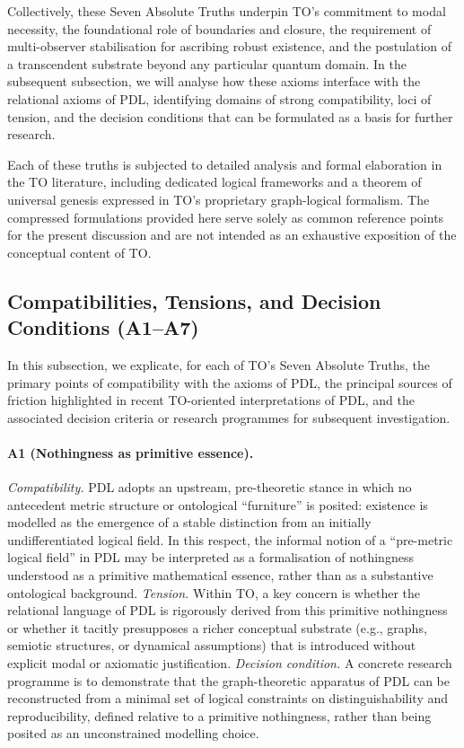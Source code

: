 \documentclass[11pt,a4paper]{article}
\begin{document}
Collectively, these Seven Absolute Truths underpin TO’s commitment to modal necessity, the foundational role of boundaries and closure, the requirement of multi-observer stabilisation for ascribing robust existence, and the postulation of a transcendent substrate beyond any particular quantum domain. In the subsequent subsection, we will analyse how these axioms interface with the relational axioms of PDL, identifying domains of strong compatibility, loci of tension, and the decision conditions that can be formulated as a basis for further research.

Each of these truths is subjected to detailed analysis and formal elaboration in the TO literature, including dedicated logical frameworks and a theorem of universal genesis expressed in TO’s proprietary graph-logical formalism. The compressed formulations provided here serve solely as common reference points for the present discussion and are not intended as an exhaustive exposition of the conceptual content of TO.

\subsection{Compatibilities, Tensions, and Decision Conditions (A1--A7)}

In this subsection, we explicate, for each of TO’s Seven Absolute Truths, the primary points of compatibility with the axioms of PDL, the principal sources of friction highlighted in recent TO-oriented interpretations of PDL, and the associated decision criteria or research programmes for subsequent investigation.

\paragraph{A1 (Nothingness as primitive essence).}
\emph{Compatibility.} PDL adopts an upstream, pre-theoretic stance in which no antecedent metric structure or ontological “furniture” is posited: existence is modelled as the emergence of a stable distinction from an initially undifferentiated logical field. In this respect, the informal notion of a “pre-metric logical field” in PDL may be interpreted as a formalisation of nothingness understood as a primitive mathematical essence, rather than as a substantive ontological background.  
\emph{Tension.} Within TO, a key concern is whether the relational language of PDL is rigorously derived from this primitive nothingness or whether it tacitly presupposes a richer conceptual substrate (e.g., graphs, semiotic structures, or dynamical assumptions) that is introduced without explicit modal or axiomatic justification.  
\emph{Decision condition.} A concrete research programme is to demonstrate that the graph-theoretic apparatus of PDL can be reconstructed from a minimal set of logical constraints on distinguishability and reproducibility, defined relative to a primitive nothingness, rather than being posited as an unconstrained modelling choice.
\end{document}
